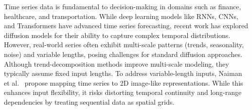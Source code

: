 Time series data is fundamental to decision-making in domains such as finance, healthcare, and transportation. While deep learning models like RNNs, CNNs, and Transformers have advanced time series forecasting, recent work has explored diffusion models for their ability to capture complex temporal distributions. However, real-world series often exhibit multi-scale patterns (trends, seasonality, noise) and variable lengths, posing challenges for standard diffusion approaches. Although trend-decomposition methods improve multi-scale modeling, they typically assume fixed input lengths. To address variable-length inputs, Naiman et al.~\cite{DBLP:conf/nips/NaimanBPAFA24} propose mapping time series to 2D image-like representations. While this enhances input flexibility, it risks distorting temporal continuity and long-range dependencies by treating sequential data as spatial grids.

